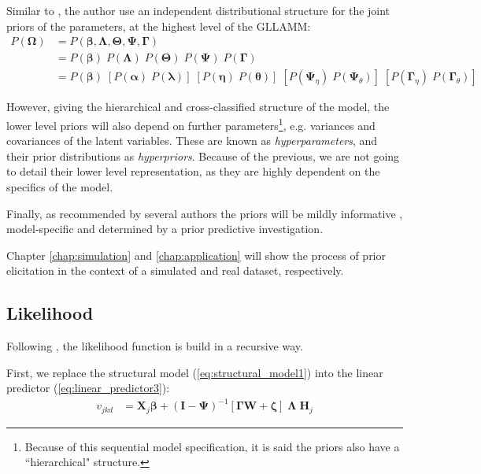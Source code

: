 Similar to \citet{Patz_et_al_1999}, the author use an independent distributional structure for the joint priors of the parameters, at the highest level of the GLLAMM:
%
\begin{equation} \label{eq:priors}
	\begin{split}
		P( \pmb{\Omega} ) & = P( \pmb{\beta}, \pmb{\Lambda}, \pmb{\Theta}, \pmb{\Psi}, \pmb{\Gamma} ) \\
		&= P( \pmb{\beta} ) \; P( \pmb{\Lambda} ) \; P( \pmb{\Theta} ) \; P( \pmb{\Psi} ) \; P( \pmb{\Gamma} ) \\
		&= P( \pmb{\beta} ) \; \left[ P( \pmb{\alpha} ) \; P( \pmb{\lambda} ) \right] \; \left[ P( \pmb{\eta} ) \; P( \pmb{\theta} ) \right] \; \left[ P( \pmb{\Psi}_{\eta} ) \; P( \pmb{\Psi}_{\theta} ) \right] \; \left[ P( \pmb{\Gamma}_{\eta} ) \; P( \pmb{\Gamma}_{\theta} ) \right]
	\end{split}
\end{equation}

\noindent However, giving the hierarchical and cross-classified structure of the model, the lower level priors will also depend on further parameters\footnote{Because of this sequential model specification, it is said the priors also have a ``hierarchical" structure.}, e.g. variances and covariances of the latent variables. These are known as \textit{hyperparameters}, and their prior distributions as \textit{hyperpriors}. Because of the previous, we are not going to detail their lower level representation, as they are highly dependent on the specifics of the model.

Finally, as recommended by several authors the priors will be mildly informative \cite{McElreath_2020, Fujimoto_2020, Tarazona_2013, Jiao_et_al_2012, Azevedo_2003, Wollack_2002}, model-specific and determined by a prior predictive investigation. 

Chapter \ref{chap:simulation} and \ref{chap:application} will show the process of prior elicitation in the context of a simulated and real dataset, respectively.


\subsection{Likelihood}

Following \citet{Rabe_et_al_2004a}, the likelihood function is build in a recursive way. 

\noindent First, we replace the structural model (\ref{eq:structural_model1}) into the linear predictor (\ref{eq:linear_predictor3}):
%
\begin{equation} \label{eq:lin_pred}
	\begin{split}
		v_{jkd} &= \mathbf{X}_{j} \pmb{\beta} + ( \mathbf{I} - \pmb{\Psi} )^{-1} \left[ \pmb{\Gamma} \mathbf{W} + \pmb{\zeta} \right] \; \pmb{\Lambda} \; \mathbf{H}_{j}
	\end{split}
\end{equation}


